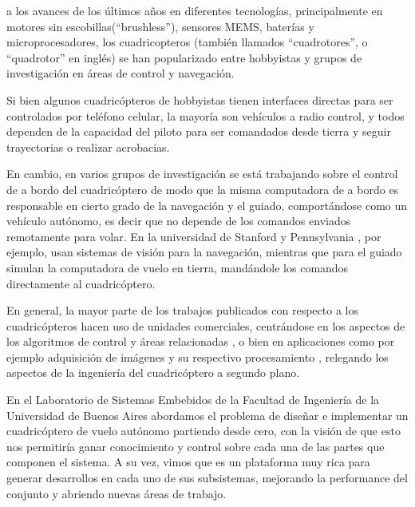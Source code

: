 \documentclass[a4paper, conference]{IEEEtran}
\begin{document}
 a los avances de los últimos años en diferentes tecnologías, principalmente en motores sin escobillas(``brushless''), sensores MEMS, baterías y microprocesadores, los cuadricopteros (también llamados ``cuadrotores'', o ``quadrotor'' en inglés) se han popularizado entre hobbyistas y grupos de investigación en áreas de control y navegación.

Si bien algunos cuadricópteros de hobbyistas \cite{parrot} tienen interfaces directas para ser controlados por teléfono celular, la mayoría son vehículos a radio control, y todos dependen de la capacidad del piloto para ser comandados desde tierra y seguir trayectorias o realizar acrobacias. 

En cambio, en varios grupos de investigación se está trabajando sobre el control de a bordo del cuadricóptero de modo que la misma computadora de a bordo es responsable en cierto grado de la navegación y el guiado, comportándose como un vehículo autónomo, es decir que no depende de los comandos enviados remotamente para volar. En la universidad de Stanford \cite{starmac} y Pennsylvania \cite{grasp}, por ejemplo, usan sistemas de visión para la navegación, mientras que para el guiado simulan la computadora de vuelo en tierra, mandándole los comandos directamente al cuadricóptero.

En general, la mayor parte de los trabajos publicados con respecto a los cuadricópteros hacen uso de unidades comerciales, centrándose en los aspectos de los algoritmos de control y áreas relacionadas \cite{starmac} \cite{grasp}, o bien en aplicaciones como por ejemplo adquisición de imágenes y su respectivo procesamiento \cite{grasp}, relegando los aspectos de la ingeniería del cuadricóptero a segundo plano. 

En el Laboratorio de Sistemas Embebidos de la Facultad de Ingeniería de la Universidad de Buenos Aires abordamos el problema de diseñar e implementar un cuadricóptero de vuelo autónomo partiendo desde cero, con la visión de que esto nos permitiría ganar conocimiento y control sobre cada una de las partes que componen el sistema. A su vez, vimos que es un plataforma muy rica para generar desarrollos en cada uno de sus subsistemas, mejorando la performance del conjunto y abriendo nuevas áreas de trabajo.
\end{document}

